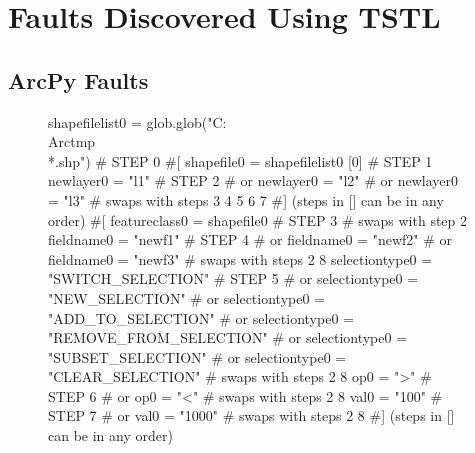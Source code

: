 \section{Faults Discovered Using TSTL}
\label{sec:bugs}

\subsection{ArcPy Faults}

\begin{figure}
{\scriptsize 
\begin{code}
shapefilelist0 = glob.glob("C:\\Arctmp\\*.shp")                             \textcolor{black!60}{\# STEP 0}
\textcolor{black!60}{\#[}
shapefile0 = shapefilelist0 [0]                                           \textcolor{black!60}{\# STEP 1}
newlayer0 = "l1"                                                          \textcolor{black!60}{\# STEP 2}
\textcolor{black!60}{\#  or newlayer0 = "l2" }
\textcolor{black!60}{\#  or newlayer0 = "l3" }
\textcolor{black!60}{\#  swaps with steps 3 4 5 6 7}
\textcolor{black!60}{\#] (steps in [] can be in any order)}
\textcolor{black!60}{\#[}
featureclass0 = shapefile0                                                \textcolor{black!60}{\# STEP 3}
\textcolor{black!60}{\#  swaps with step 2}
fieldname0 = "newf1"                                                      \textcolor{black!60}{\# STEP 4}
\textcolor{black!60}{\#  or fieldname0 = "newf2" }
\textcolor{black!60}{\#  or fieldname0 = "newf3" }
\textcolor{black!60}{\#  swaps with steps 2 8}
selectiontype0 = "SWITCH\_SELECTION"                                       \textcolor{black!60}{\# STEP 5}
\textcolor{black!60}{\#  or selectiontype0 = "NEW\_SELECTION" }
\textcolor{black!60}{\#  or selectiontype0 = "ADD\_TO\_SELECTION" }
\textcolor{black!60}{\#  or selectiontype0 = "REMOVE\_FROM\_SELECTION"}
\textcolor{black!60}{\#  or selectiontype0 = "SUBSET\_SELECTION"}
\textcolor{black!60}{\#  or selectiontype0 = "CLEAR\_SELECTION"   }
\textcolor{black!60}{\#  swaps with steps 2 8}
op0 = ">"                                                                 \textcolor{black!60}{\# STEP 6}
\textcolor{black!60}{\#  or op0 = "<" }
\textcolor{black!60}{\#  swaps with steps 2 8}
val0 = "100"                                                              \textcolor{black!60}{\# STEP 7}
\textcolor{black!60}{\#  or val0 = "1000" }
\textcolor{black!60}{\#  swaps with steps 2 8}
\textcolor{black!60}{\#] (steps in [] can be in any order)}

\end{code}}
\end{figure}
